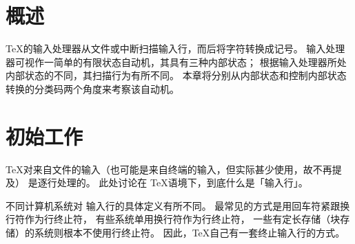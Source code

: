 \documentclass{book}
\begin{document}
\section{概述}

\TeX 的输入处理器从文件或中断扫描输入行，而后将字符转换成记号。
输入处理器可视作一简单的有限状态自动机，其具有三种内部状态；
根据输入处理器所处内部状态的不同，其扫描行为有所不同。
本章将分别从内部状态和控制内部状态转换的分类码两个角度来考察该自动机。

\section{初始工作}

\TeX 对来自文件的输入（也可能是来自终端的输入，但实际甚少使用，故不再提及）
是逐行处理的。
此处讨论在 \TeX 语境下，到底什么是「输入行」。

不同计算机系统对
输入行的具体定义有所不同。
最常见的方式是用回车符紧跟换行符作为行终止符，
有些系统单用换行符作为行终止符，
一些有定长存储（块存储）的系统则根本不使用行终止符。
因此，\TeX 自己有一套终止输入行的方式。
\end{document}
